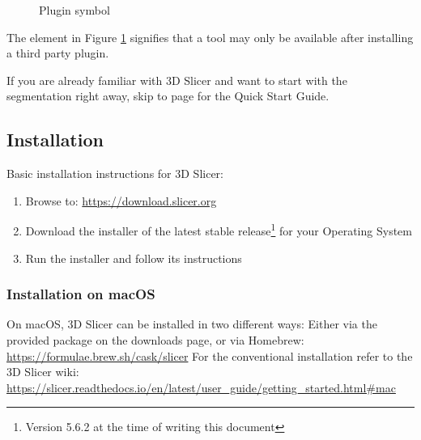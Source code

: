 \begin{figure}[h!] %
	\centering
	
	\caption{Plugin symbol}
	\label{fig:plugin_icon}
\end{figure}
\noindent
The element in Figure \ref{fig:plugin_icon} signifies that a tool may only be available after installing a third party plugin.\newline

\noindent
If you are already familiar with 3D Slicer and want to start with the segmentation right away, skip to page \pageref{qsg} for the Quick Start Guide.

\subsection{Installation}
Basic installation instructions for 3D Slicer:
\begin{enumerate}
	\item Browse to: \url{https://download.slicer.org}
	\item Download the installer of the latest stable release\footnote{Version 5.6.2 at the time of writing this document} for your Operating System
	\item Run the installer and follow its instructions
\end{enumerate}

\subsubsection{Installation on macOS}
On macOS, 3D Slicer can be installed in two different ways:\newline\newline
Either via the provided package on the downloads page, or via Homebrew: \url{https://formulae.brew.sh/cask/slicer}\newline
For the conventional installation refer to the 3D Slicer wiki: \url{https://slicer.readthedocs.io/en/latest/user_guide/getting_started.html#mac}

